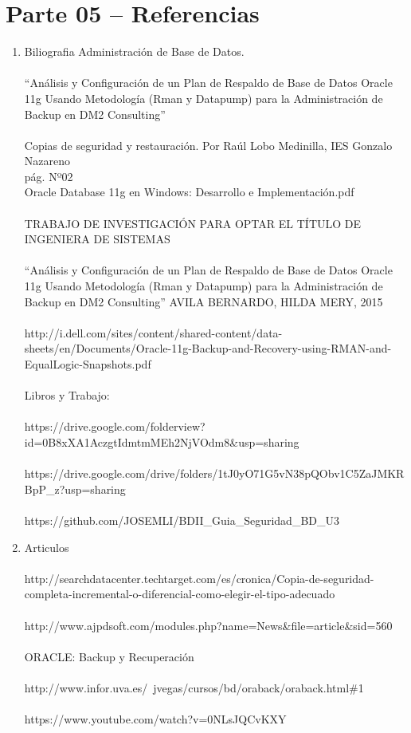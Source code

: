 \section{Parte 05 – Referencias} 

\begin{enumerate}[1.]
	\item Biliografia
	\subitem Administración de Base de Datos.
	\\\\“Análisis y Configuración de un Plan de Respaldo de Base de Datos Oracle 11g Usando Metodología (Rman y Datapump) para la Administración de Backup en DM2 Consulting”
	\\\\Copias de seguridad y restauración. Por Raúl Lobo Medinilla, IES Gonzalo Nazareno
	\\pág. Nº02
	\\Oracle Database 11g en Windows: Desarrollo e Implementación.pdf
	\\\\TRABAJO DE INVESTIGACIÓN PARA OPTAR EL TÍTULO DE INGENIERA DE SISTEMAS
	\\\\“Análisis y Configuración de un Plan de Respaldo de Base de Datos Oracle 11g Usando Metodología (Rman y Datapump) para la Administración de Backup en DM2 Consulting” AVILA BERNARDO, HILDA MERY, 2015
	\\\\http://i.dell.com/sites/content/shared-content/data-sheets/en/Documents/Oracle-11g-Backup-and-Recovery-using-RMAN-and-EqualLogic-Snapshots.pdf
	\\\\Libros y Trabajo: 
	\\\\https://drive.google.com/folderview?id=0B8xXA1AczgtIdmtmMEh2NjVOdm8\&usp=sharing
	\\\\https://drive.google.com/drive/folders/1tJ0yO71G5vN38pQObv1C5ZaJMKRBpP_z?usp=sharing
	\\\\https://github.com/JOSEMLI/BDII\_Guia\_Seguridad\_BD\_U3

	\item Articulos
	\\\\http://searchdatacenter.techtarget.com/es/cronica/Copia-de-seguridad-completa-incremental-o-diferencial-como-elegir-el-tipo-adecuado
	\\\\http://www.ajpdsoft.com/modules.php?name=News\&file=article\&sid=560
	\\\\ORACLE: Backup y Recuperación 
	\\\\http://www.infor.uva.es/~jvegas/cursos/bd/oraback/oraback.html\#1
	\\\\https://www.youtube.com/watch?v=0NLsJQCvKXY
	

\end{enumerate} 
